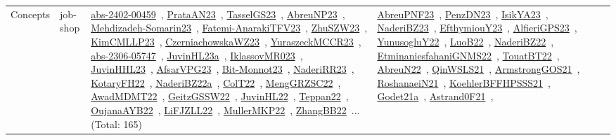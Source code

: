 {\begin{longtable}{lp{3cm}>{\raggedright\arraybackslash}p{6cm}>{\raggedright\arraybackslash}p{6cm}>{\raggedright\arraybackslash}p{8cm}}
\index{job-shop}\index{Concepts!job-shop}Concepts & job-shop & \href{../works/abs-2402-00459.pdf}{abs-2402-00459}~\cite{abs-2402-00459}, \href{../works/PrataAN23.pdf}{PrataAN23}~\cite{PrataAN23}, \href{../works/TasselGS23.pdf}{TasselGS23}~\cite{TasselGS23}, \href{../works/AbreuNP23.pdf}{AbreuNP23}~\cite{AbreuNP23}, \href{../works/Mehdizadeh-Somarin23.pdf}{Mehdizadeh-Somarin23}~\cite{Mehdizadeh-Somarin23}, \href{../works/Fatemi-AnarakiTFV23.pdf}{Fatemi-AnarakiTFV23}~\cite{Fatemi-AnarakiTFV23}, \href{../works/ZhuSZW23.pdf}{ZhuSZW23}~\cite{ZhuSZW23}, \href{../works/KimCMLLP23.pdf}{KimCMLLP23}~\cite{KimCMLLP23}, \href{../works/CzerniachowskaWZ23.pdf}{CzerniachowskaWZ23}~\cite{CzerniachowskaWZ23}, \href{../works/YuraszeckMCCR23.pdf}{YuraszeckMCCR23}~\cite{YuraszeckMCCR23}, \href{../works/abs-2306-05747.pdf}{abs-2306-05747}~\cite{abs-2306-05747}, \href{../works/JuvinHL23a.pdf}{JuvinHL23a}~\cite{JuvinHL23a}, \href{../works/IklassovMR023.pdf}{IklassovMR023}~\cite{IklassovMR023}, \href{../works/JuvinHHL23.pdf}{JuvinHHL23}~\cite{JuvinHHL23}, \href{../works/AfsarVPG23.pdf}{AfsarVPG23}~\cite{AfsarVPG23}, \href{../works/Bit-Monnot23.pdf}{Bit-Monnot23}~\cite{Bit-Monnot23}, \href{../works/NaderiRR23.pdf}{NaderiRR23}~\cite{NaderiRR23}, \href{../works/KotaryFH22.pdf}{KotaryFH22}~\cite{KotaryFH22}, \href{../works/NaderiBZ22a.pdf}{NaderiBZ22a}~\cite{NaderiBZ22a}, \href{../works/ColT22.pdf}{ColT22}~\cite{ColT22}, \href{../works/MengGRZSC22.pdf}{MengGRZSC22}~\cite{MengGRZSC22}, \href{../works/AwadMDMT22.pdf}{AwadMDMT22}~\cite{AwadMDMT22}, \href{../works/GeitzGSSW22.pdf}{GeitzGSSW22}~\cite{GeitzGSSW22}, \href{../works/JuvinHL22.pdf}{JuvinHL22}~\cite{JuvinHL22}, \href{../works/Teppan22.pdf}{Teppan22}~\cite{Teppan22}, \href{../works/OujanaAYB22.pdf}{OujanaAYB22}~\cite{OujanaAYB22}, \href{../works/LiFJZLL22.pdf}{LiFJZLL22}~\cite{LiFJZLL22}, \href{../works/MullerMKP22.pdf}{MullerMKP22}~\cite{MullerMKP22}, \href{../works/ZhangBB22.pdf}{ZhangBB22}~\cite{ZhangBB22}... (Total: 165) & \href{../works/AbreuPNF23.pdf}{AbreuPNF23}~\cite{AbreuPNF23}, \href{../works/PenzDN23.pdf}{PenzDN23}~\cite{PenzDN23}, \href{../works/IsikYA23.pdf}{IsikYA23}~\cite{IsikYA23}, \href{../works/NaderiBZ23.pdf}{NaderiBZ23}~\cite{NaderiBZ23}, \href{../works/EfthymiouY23.pdf}{EfthymiouY23}~\cite{EfthymiouY23}, \href{../works/AlfieriGPS23.pdf}{AlfieriGPS23}~\cite{AlfieriGPS23}, \href{../works/YunusogluY22.pdf}{YunusogluY22}~\cite{YunusogluY22}, \href{../works/LuoB22.pdf}{LuoB22}~\cite{LuoB22}, \href{../works/NaderiBZ22.pdf}{NaderiBZ22}~\cite{NaderiBZ22}, \href{../works/EtminaniesfahaniGNMS22.pdf}{EtminaniesfahaniGNMS22}~\cite{EtminaniesfahaniGNMS22}, \href{../works/TouatBT22.pdf}{TouatBT22}~\cite{TouatBT22}, \href{../works/AbreuN22.pdf}{AbreuN22}~\cite{AbreuN22}, \href{../works/QinWSLS21.pdf}{QinWSLS21}~\cite{QinWSLS21}, \href{../works/ArmstrongGOS21.pdf}{ArmstrongGOS21}~\cite{ArmstrongGOS21}, \href{../works/RoshanaeiN21.pdf}{RoshanaeiN21}~\cite{RoshanaeiN21}, \href{../works/KoehlerBFFHPSSS21.pdf}{KoehlerBFFHPSSS21}~\cite{KoehlerBFFHPSSS21}, \href{../works/Godet21a.pdf}{Godet21a}~\cite{Godet21a}, \href{../works/Astrand0F21.pdf}{Astrand0F21}~\cite{Astrand0F21}, 
\end{longtable}}
